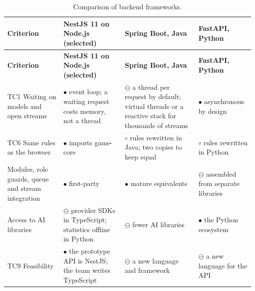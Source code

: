 {\small
\begin{longtable}{|>{\raggedright\arraybackslash}p{}|>{\raggedright\arraybackslash}p{}|>{\raggedright\arraybackslash}p{}|>{\raggedright\arraybackslash}p{}|}
\caption{Comparison of backend frameworks.} \\
\hline
\textbf{Criterion} & \textbf{NestJS 11 on Node.js (selected)} & \textbf{Spring Boot, Java\cite{r179}} & \textbf{FastAPI, Python\cite{r181}} \\ \hline
\endfirsthead
\hline
\textbf{Criterion} & \textbf{NestJS 11 on Node.js (selected)} & \textbf{Spring Boot, Java\cite{r179}} & \textbf{FastAPI, Python\cite{r181}} \\ \hline
\endhead
TC1 Waiting on models and open streams & $\bullet$ event loop; a waiting request costs memory, not a thread & $\ominus$ a thread per request by default; virtual threads\cite{r180} or a reactive stack for thousands of streams & $\bullet$ asynchronous by design \\ \hline
TC6 Same rules as the browser & $\bullet$ imports game-core & $\circ$ rules rewritten in Java; two copies to keep equal & $\circ$ rules rewritten in Python \\ \hline
Modules, role guards, queue and stream integration & $\bullet$ first-party\cite{r149} & $\bullet$ mature equivalents & $\ominus$ assembled from separate libraries \\ \hline
Access to AI libraries & $\ominus$ provider SDKs in TypeScript; statistics offline in Python & $\ominus$ fewer AI libraries & $\bullet$ the Python ecosystem \\ \hline
TC9 Feasibility & $\bullet$ the prototype API is NestJS; the team writes TypeScript & $\ominus$ a new language and framework & $\ominus$ a new language for the API \\ \hline
\end{longtable}
}

